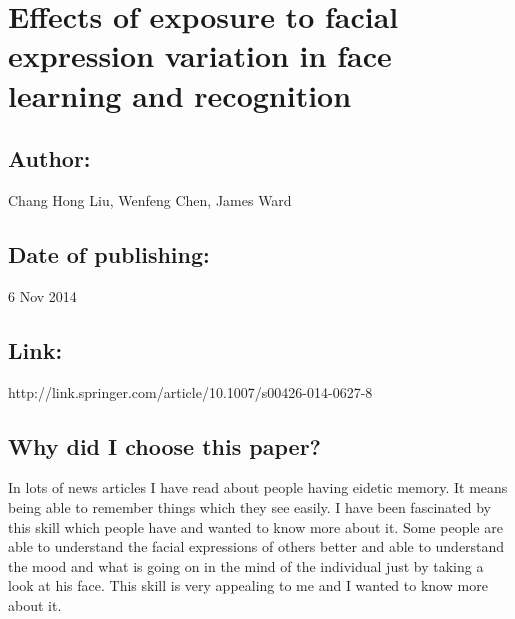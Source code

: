 \documentclass{article}
\begin{document}
	\section{Effects of exposure to facial expression variation in face learning and recognition}
		\subsection{Author:} Chang Hong Liu, Wenfeng Chen, James Ward
		\subsection{Date of publishing:} 6 Nov 2014
		\subsection{Link:} http://link.springer.com/article/10.1007/s00426-014-0627-8
		\subsection{Why did I choose this paper?}
			In lots of news articles I have read about people having eidetic memory. It means being able to remember things which they see easily. I have been fascinated by this skill which people have and wanted to know more about it. Some people are able to understand the facial expressions of others better and able to understand the mood and what is going on in the mind of the individual just by taking a look at his face. This skill is very appealing to me and I wanted to know more about it.
\end{document}

